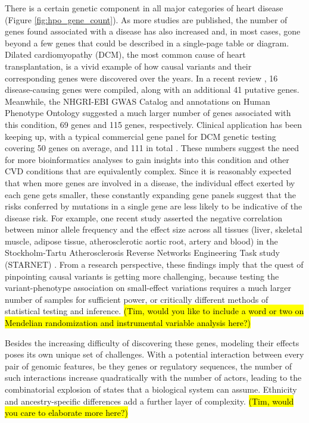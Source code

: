 \documentclass[letter]{bioinfo}
\begin{document}
There is a certain genetic component in all major categories of heart disease (Figure \ref{fig:hpo_gene_count}).  As more studies are published, the number of genes found associated with a disease has also increased and, in most cases, gone beyond a few genes that could be described in a single-page table or diagram.  Dilated cardiomyopathy (DCM), the most common cause of heart transplantation, is a vivid example of how causal variants and their corresponding genes were discovered over the years.  In a recent review \citep{Burke:2016:Clinical}, 16 disease-causing genes were compiled, along with an additional 41 putative genes.  Meanwhile, the NHGRI-EBI GWAS Catalog \citep{MacArthur:2017:new} and annotations on Human Phenotype Ontology \citep{Kohler:2017:Human} suggested a much larger number of genes associated with this condition, 69 genes and 115 genes, respectively.  Clinical application has been keeping up, with a typical commercial gene panel for DCM genetic testing covering 50 genes on average, and 111 in total \citep{McNally:2017:Dilated}.  These numbers suggest the need for more bioinformatics analyses to gain insights into this condition and other CVD conditions that are equivalently complex.  Since it is reasonably expected that when more genes are involved in a disease, the individual effect exerted by each gene gets smaller, these constantly expanding gene panels suggest that the risks conferred by mutations in a single gene are less likely to be indicative of the disease risk.  For example, one recent study asserted the negative correlation between minor allele frequency and the effect size across all tissues (liver, skeletal muscle, adipose tissue, atherosclerotic aortic root, artery and blood) in the Stockholm-Tartu Atherosclerosis Reverse Networks Engineering Task study (STARNET) \citep{Franzen:2016:Cardiometabolic}.  From a research perspective, these findings imply that the quest of pinpointing causal variants is getting more challenging, because testing the variant-phenotype association on small-effect variations requires a much larger number of samples for sufficient power, or critically different methods of statistical testing and inference. \hl{(Tim, would you like to include a word or two on Mendelian randomization and instrumental variable analysis here?)}
	
	
Besides the increasing difficulty of discovering these genes, modeling their effects poses its own unique set of challenges. With a potential interaction between every pair of genomic features, be they genes or regulatory sequences, the number of such interactions increase quadratically with the number of actors, leading to the combinatorial explosion of states that a biological system can assume.  Ethnicity and ancestry-specific differences add a further layer of complexity. \hl{(Tim, would you care to elaborate more here?)}
	
\end{document}
